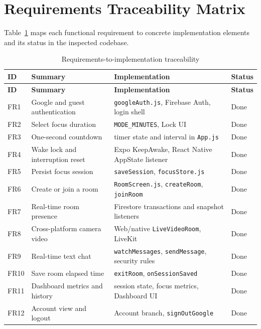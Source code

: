 \section{Requirements Traceability Matrix}
Table~\ref{tab:traceability} maps each functional requirement to concrete implementation elements and its status in the inspected codebase.

\small
\begin{longtable}{|p{}|p{}|p{}|p{}|}
\caption{Requirements-to-implementation traceability}\label{tab:traceability}\\
\hline
\textbf{ID} & \textbf{Summary} & \textbf{Implementation} & \textbf{Status} \\ \hline
\endfirsthead
\hline \textbf{ID} & \textbf{Summary} & \textbf{Implementation} & \textbf{Status} \\ \hline
\endhead
FR1 & Google and guest authentication & \texttt{googleAuth.js}, Firebase Auth, login shell & Done \\ \hline
FR2 & Select focus duration & \texttt{MODE\_MINUTES}, Lock UI & Done \\ \hline
FR3 & One-second countdown & timer state and interval in \texttt{App.js} & Done \\ \hline
FR4 & Wake lock and interruption reset & Expo KeepAwake, React Native AppState listener & Done \\ \hline
FR5 & Persist focus session & \texttt{saveSession}, \texttt{focusStore.js} & Done \\ \hline
FR6 & Create or join a room & \texttt{RoomScreen.js}, \texttt{createRoom}, \texttt{joinRoom} & Done \\ \hline
FR7 & Real-time room presence & Firestore transactions and snapshot listeners & Done \\ \hline
FR8 & Cross-platform camera video & Web/native \texttt{LiveVideoRoom}, LiveKit & Done \\ \hline
FR9 & Real-time text chat & \texttt{watchMessages}, \texttt{sendMessage}, security rules & Done \\ \hline
FR10 & Save room elapsed time & \texttt{exitRoom}, \texttt{onSessionSaved} & Done \\ \hline
FR11 & Dashboard metrics and history & session state, focus metrics, Dashboard UI & Done \\ \hline
FR12 & Account view and logout & Account branch, \texttt{signOutGoogle} & Done \\ \hline
\end{longtable}
\normalsize

